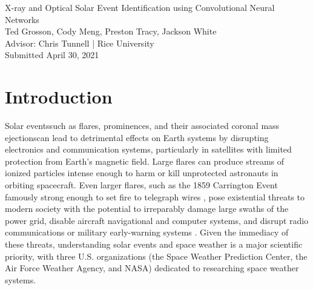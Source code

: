 \documentclass[12pt, letterpaper]{article}
\begin{document}
\begin{center}
    \Large X-ray and Optical Solar Event Identification using Convolutional Neural Networks \\
    \vspace{.6em}
    \large Ted Grosson, Cody Meng, Preston Tracy, Jackson White
    \vspace{.3em}
    \\ Advisor: Chris Tunnell | Rice University
    \vspace{.5em}
    \normalsize
    \\ Submitted April 30, 2021
    \\
\end{center} \vspace{-2.3em}


\section*{Introduction}

Solar events\textemdash such as flares, prominences, and their associated coronal mass ejections\textemdash can lead to detrimental effects on Earth systems by disrupting electronics and communication systems, particularly in satellites with limited protection from Earth's magnetic field. Large flares can produce streams of ionized particles intense enough to harm or kill unprotected astronauts in orbiting spacecraft. Even larger flares, such as the 1859 Carrington Event famously strong enough to set fire to telegraph wires \cite{Bell2008}, pose existential threats to modern society with the potential to irreparably damage large swaths of the power grid, disable aircraft navigational and computer systems, and disrupt radio communications or military early-warning systems \cite{FlareDamage}. Given the immediacy of these threats, understanding solar events and space weather is a major scientific priority, with three U.S. organizations (the Space Weather Prediction Center, the Air Force Weather Agency, and NASA) dedicated to researching space weather systems. 
\end{document}
